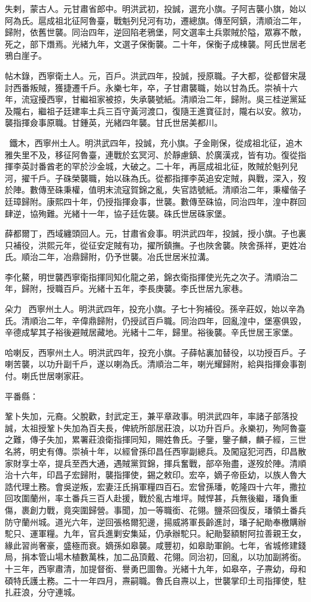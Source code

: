 \begin{pinyinscope}
失剌，蒙古人。元甘肅省郎中。明洪武初，投誠，選充小旗。子阿吉襲小旗，始以阿為氏。扈成祖北征阿魯臺，戰魁列兒河有功，遷總旗。傳至阿鎮，清順治二年，歸附，依舊世襲。同治四年，逆回陷老鴉堡，阿文選率土兵禦賊於隘，眾寡不敵，死之，部下熸焉。光緒九年，文選子保衡襲。二十年，保衡子成棟襲。阿氏世居老鴉白崖子。

帖木錄，西寧衛土人。元，百戶。洪武四年，投誠，授原職。子大都，從都督宋晟討西番叛賊，獲捷遷千戶。永樂七年，卒，子甘肅襲職，始以甘為氏。崇禎十六年，流寇擾西寧，甘繼祖家被掠，失承襲號紙。清順治二年，歸附。吳三桂逆黨延及隴右，繼祖子廷建率土兵三百守黃河渡口，復隨王進寶征討，隴右以安。敘功，襲指揮僉事原職。甘鍾英，光緒四年襲。甘氏世居美都川。

鐵木，西寧州土人。明洪武四年，投誠，充小旗。子金剛保，從成祖北征，追木雅失里不及，移征阿魯臺，連戰於玄冥河、於靜慮鎮、於廣漢戎，皆有功。復從指揮李英討番酋老的罕於沙金城，大破之。二十年，再扈成祖北征，敗賊於魁列兒河，擢千戶。子硃榮襲職，始以硃為氏。從都指揮李英追安定賊，與戰，深入，歿於陣。數傳至硃秉權，值明末流寇賀錦之亂，失官誥號紙。清順治二年，秉權偕子廷璋歸附。康熙四十年，仍授指揮僉事，世襲。數傳至硃協，同治四年，湟中群回肆逆，協殉難。光緒十一年，協子廷佐襲。硃氏世居硃家堡。

薛都爾丁，西域纏頭回人。元，甘肅省僉事。明洪武四年，投誠，授小旗。子也裏只補役，洪熙元年，從征安定賊有功，擢所鎮撫。子也陜舍襲。陜舍孫祥，更姓冶氏。順治二年，冶鼎歸附，仍予世襲。冶氏世居米拉溝。

李化鰲，明世襲西寧衛指揮同知化龍之弟，錦衣衛指揮使光先之次子。清順治二年，歸附，授職百戶。光緒十五年，李長庚襲。李氏世居九家巷。

朵力，西寧州土人。明洪武四年，投充小旗。子七十狗補役。孫辛莊奴，始以辛為氏。清順治二年，辛偉鼎歸附，仍授試百戶職。同治四年，回亂湟中，堡塞俱毀，辛德成挈其子裕後避賊居藏地。光緒十二年，歸里。裕後襲。辛氏世居王家堡。

哈喇反，西寧州土人。明洪武四年，投充小旗。子薛帖裏加替役，以功授百戶。子喇苦襲，以功升副千戶，遂以喇為氏。清順治二年，喇光耀歸附，給與指揮僉事劄付。喇氏世居喇家莊。

平番縣：

鞏卜失加，元裔。父脫歡，封武定王，兼平章政事。明洪武四年，率諸子部落投誠，太祖授鞏卜失加為百夫長，俾統所部居莊浪，以功升百戶。永樂初，殉阿魯臺之難，傳子失加，累署莊浪衛指揮同知，賜姓魯氏。子鑒，鑒子麟，麟子經，三世名將，明史有傳。崇禎十年，以經曾孫印昌任西寧副總兵。及闖寇犯河西，印昌散家財享士卒，提兵至西大通，遇賊黨賀錦，揮兵奮戰，部卒殆盡，遂歿於陣。清順治十六年，印昌子宏歸附，襲指揮使，錫之敕印。宏卒，嫡子帝臣幼，以族人魯大誥代理土務。會吳逆叛，宏妻汪氏捐軍糧四百石。宏曾孫璠，乾隆四十六年，撒拉回攻圍蘭州，率土番兵三百人赴援，戰於亂古堆坪。賊悍甚，兵無後繼，璠負重傷，裹創力戰，竟突圍歸營。事聞，加一等職銜、花翎。鹽茶回復反，璠領土番兵防守蘭州城。道光六年，逆回張格爾犯邊，揚威將軍長齡進討，璠子紀勛奉檄購辦駝只、運軍糧。九年，官兵進剿安集延，仍承辦駝只。紀勛娶額駙阿拉善親王女，緣此習尚奢豪，盛極而衰。嫡孫如皋襲。咸豐初，如皋助軍餉。七年，省城修建錢局，捐本管山場木植數萬株，加二品頂戴、花翎。同治初，回亂，以功加副將銜。十三年，西寧肅清，加提督銜、譽勇巴圖魯。光緒十九年，如皋卒，子燾幼，母和碩特氏護土務。二十一年四月，燾嗣職。魯氏自燾以上，世襲掌印土司指揮使，駐扎莊浪，分守連城。


\end{pinyinscope}
